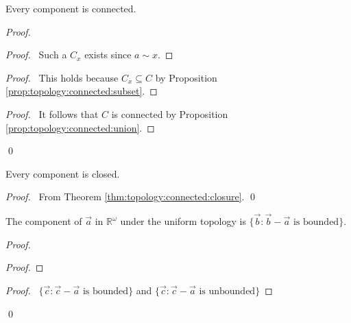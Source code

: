 \begin{prop}[AC]
  \label{prop:topology:component:connected}
  Every component is connected.
\end{prop}

\begin{proof}
  \pf
  \begin{proof}
    \pf\ Such a $C_x$ exists since $a \sim x$.
  \end{proof}
  \begin{proof}
    \pf\ This holds because $C_x \subseteq C$ by Proposition
    \ref{prop:topology:connected:subset}.
  \end{proof}
  \qedstep
  \begin{proof}
    \pf\ It follows that $C$ is connected by Proposition
    \ref{prop:topology:connected:union}.
  \end{proof}
  \qed
\end{proof}

\begin{prop}
  Every component is closed.
\end{prop}

\begin{proof}
  \pf\ From Theorem \ref{thm:topology:connected:closure}. \qed
\end{proof}

 \begin{prop}
 The component of $\vec{a}$ in $\mathbb{R}^\omega$ under the uniform topology
 is $\{ \vec{b} : \vec{b} - \vec{a} \text{ is bounded} \}$.
\end{prop}

\begin{proof}
\pf
{}
\begin{proof}
\end{proof}
\begin{proof}
  \pf\ $\{ \vec{c} : \vec{c} - \vec{a} \text{ is bounded} \}$ and $\{ \vec{c}
  : \vec{c} - \vec{a} \text{ is unbounded} \}$
\end{proof}
\qed
\end{proof}


